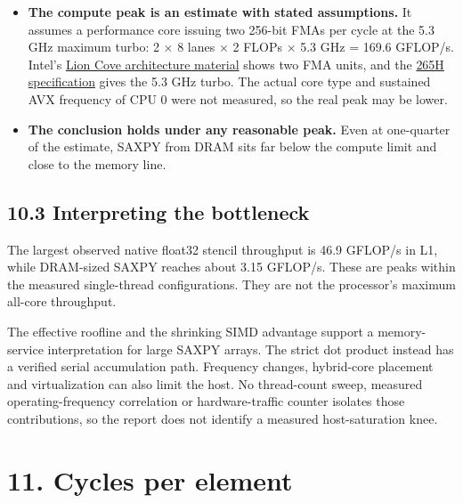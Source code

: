 \documentclass[10pt,letterpaper]{article}
\begin{document}
\begin{itemize}\setlength{\itemsep}{2pt}

\item \textbf{The compute peak is an estimate with stated assumptions.} It assumes a performance core issuing two 256-bit FMAs per cycle at the 5.3 GHz maximum turbo: 2 $\times$ 8 lanes $\times$ 2 FLOPs $\times$ 5.3 GHz = 169.6 GFLOP/s. Intel's \href{https://cdrdv2-public.intel.com/824430/2024_Intel_Tech\%20Tour\%20TW_Next\%20Gen\%20P-core\%20The\%20Lion\%20Cove\%20Architecture-4.pdf}{Lion Cove architecture material} shows two FMA units, and the \href{https://www.intel.com/content/www/us/en/products/sku/241750/intel-core-ultra-7-processor-265h-24m-cache-up-to-5-30-ghz/specifications.html}{265H specification} gives the 5.3 GHz turbo. The actual core type and sustained AVX frequency of CPU 0 were not measured, so the real peak may be lower.

\item \textbf{The conclusion holds under any reasonable peak.} Even at one-quarter of the estimate, SAXPY from DRAM sits far below the compute limit and close to the memory line.

\end{itemize}

\subsection*{10.3 Interpreting the bottleneck}

The largest observed native float32 stencil throughput is 46.9 GFLOP/s in L1, while DRAM-sized SAXPY reaches about 3.15 GFLOP/s. These are peaks within the measured single-thread configurations. They are not the processor's maximum all-core throughput.


The effective roofline and the shrinking SIMD advantage support a memory-service interpretation for large SAXPY arrays. The strict dot product instead has a verified serial accumulation path. Frequency changes, hybrid-core placement and virtualization can also limit the host. No thread-count sweep, measured operating-frequency correlation or hardware-traffic counter isolates those contributions, so the report does not identify a measured host-saturation knee.


\section*{11. Cycles per element}
\end{document}

